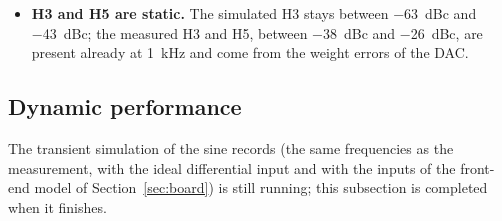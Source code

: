 {\begin{itemize}
        front-end model produces at most \SI{\SimFeHtwoMax}{dBc} of H2 in the simulated converter. The
        measurement reaches \SI{\MeasHtwoHigh}{dBc} at \SI{\MeasFreqHigh}{kHz}, so the ADC's
        response to the common-mode ripple cannot explain it: the op-amps themselves distort near
        their slew-rate limit, which also explains why the measured amplitude at high frequency is
        below the linear model (Section~\ref{sec:board}).
  \item \textbf{H3 and H5 are static.} The simulated H3 stays between \SI{-63}{dBc} and
        \SI{-43}{dBc}; the measured H3 and H5, between \SI{-38}{dBc} and \SI{-26}{dBc}, are present already
        at \SI{1}{kHz} and come from the weight errors of the DAC.
\end{itemize}}{%
\subsection{Dynamic performance}
The transient simulation of the sine records (the same frequencies as the measurement, with the ideal
differential input and with the inputs of the front-end model of Section~\ref{sec:board}) is still
running; this subsection is completed when it finishes.}

